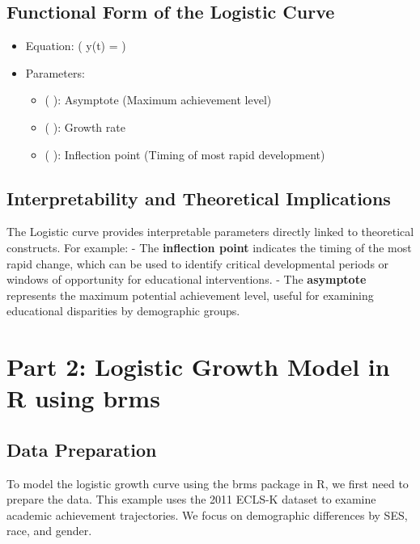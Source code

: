 \documentclass[
  letterpaper,
  DIV=11,
  numbers=noendperiod]{scrreprt}
\providecommand{\tightlist}{%
  \setlength{\itemsep}{0pt}\setlength{\parskip}{0pt}}\usepackage{longtable,booktabs,array}
\begin{document}
\subsection{Functional Form of the Logistic
Curve}\label{functional-form-of-the-logistic-curve}

\begin{itemize}
\tightlist
\item
  Equation: ( y(t) =  )
\item
  Parameters:

  \begin{itemize}
  \tightlist
  \item
    ( \alpha ): Asymptote (Maximum achievement level)
  \item
    ( \beta ): Growth rate
  \item
    ( \gamma ): Inflection point (Timing of most rapid development)
  \end{itemize}
\end{itemize}

\subsection{Interpretability and Theoretical
Implications}\label{interpretability-and-theoretical-implications}

The Logistic curve provides interpretable parameters directly linked to
theoretical constructs. For example: - The \textbf{inflection point}
indicates the timing of the most rapid change, which can be used to
identify critical developmental periods or windows of opportunity for
educational interventions. - The \textbf{asymptote} represents the
maximum potential achievement level, useful for examining educational
disparities by demographic groups.

\section{Part 2: Logistic Growth Model in R using
brms}\label{part-2-logistic-growth-model-in-r-using-brms}

\subsection{Data Preparation}\label{data-preparation}

To model the logistic growth curve using the brms package in R, we first
need to prepare the data. This example uses the 2011 ECLS-K dataset to
examine academic achievement trajectories. We focus on demographic
differences by SES, race, and gender.
\end{document}

